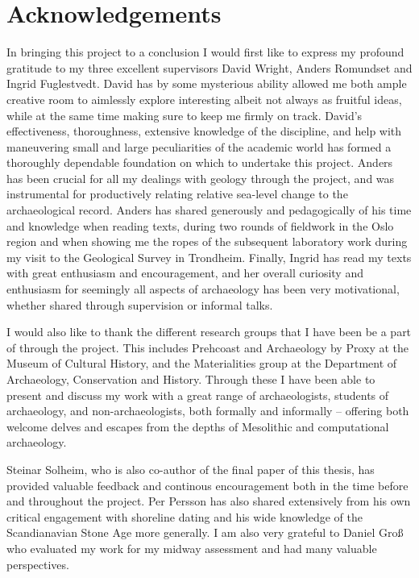 \pagestyle{plain}
\setcounter{page}{3}

\section*{Acknowledgements}
In bringing this project to a conclusion I would first like to express my profound gratitude to my three excellent supervisors David Wright, Anders Romundset and Ingrid Fuglestvedt. David has by some mysterious ability allowed me both ample creative room to aimlessly explore interesting albeit not always as fruitful ideas, while at the same time making sure to keep me firmly on track. David's effectiveness, thoroughness, extensive knowledge of the discipline, and help with maneuvering small and large peculiarities of the academic world has formed a thoroughly dependable foundation on which to undertake this project. Anders has been crucial for all my dealings with geology through the project, and was instrumental for productively relating relative sea-level change to the archaeological record. Anders has shared generously and pedagogically of his time and knowledge when reading texts, during two rounds of fieldwork in the Oslo region and when showing me the ropes of the subsequent laboratory work during my visit to the Geological Survey in Trondheim. Finally, Ingrid has read my texts with great enthusiasm and encouragement, and her overall curiosity and enthusiasm for seemingly all aspects of archaeology has been very motivational, whether shared through supervision or informal talks.

I would also like to thank the different research groups that I have been be a part of through the project. This includes Prehcoast and Archaeology by Proxy at the Museum of Cultural History, and the Materialities group at the Department of Archaeology, Conservation and History. Through these I have been able to present and discuss my work with a great range of archaeologists, students of archaeology, and non-archaeologists, both formally and informally -- offering both welcome delves and escapes from the depths of Mesolithic and computational archaeology.

Steinar Solheim, who is also co-author of the final paper of this thesis, has provided valuable feedback and continous encouragement both in the time before and throughout the project. Per Persson has also shared extensively from his own critical engagement with shoreline dating and his wide knowledge of the Scandianavian Stone Age more generally. I am also very grateful to Daniel Groß who evaluated my work for my midway assessment and had many valuable perspectives. 

